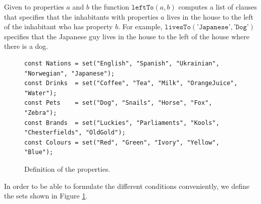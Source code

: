 Given to properties $a$ and $b$ the function $\texttt{leftTo}(a, b)$ computes a
list of clauses that specifies that the inhabitants with properties $a$ lives in
the house to the left of the inhabitant who has property $b$.  For example,
$\texttt{livesTo}(\texttt{'Japanese'}, \texttt{'Dog'})$ specifies that the
Japanese guy lives in the house to the left of the house where there is a dog.

\begin{figure}[!ht]
\centering
\begin{verbatim}
const Nations = set("English", "Spanish", "Ukrainian", "Norwegian", "Japanese");
const Drinks  = set("Coffee", "Tea", "Milk", "OrangeJuice", "Water");
const Pets    = set("Dog", "Snails", "Horse", "Fox", "Zebra");
const Brands  = set("Luckies", "Parliaments", "Kools", "Chesterfields", "OldGold");
const Colours = set("Red", "Green", "Ivory", "Yellow", "Blue");
\end{verbatim}
\vspace*{-0.3cm}
\caption{Definition of the properties.}
\label{fig:properties}
\end{figure}

In order to be able to formulate the different conditions conveniently, we define the sets
shown in Figure \ref{fig:properties}.

